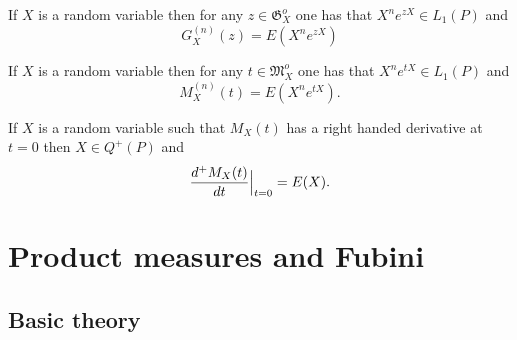 \begin{shaded}
\begin{theorem}
If $X$ is a random variable then for any $z\in \mathfrak G^o_X$ one has that $ X^n e^{zX} \in L_1(P)$ and
\[
G_X^{(n)}(z) = E(X^n e^{zX})
\]
\end{theorem}


\begin{theorem}
If $X$ is a random variable then for any $t\in \mathfrak M_{X}^o$ one has that $ X^n e^{tX} \in L_1(P)$ and
\[ M^{(n)}_{X}(t)= E(X^n e^{tX}).\]
\end{theorem}




\begin{theorem}
If $X$ is a random variable such that $M_X(t)$ has a right handed derivative at $t=0$ then $X\in Q^+(P)$ and
\[ \Bigl.\frac{d^+M_X(t)}{dt}\Bigr|_{t=0}= E(X).\]
\end{theorem}




\end{shaded}


\clearpage
\section{Product measures and Fubini}

\subsection{Basic theory}





